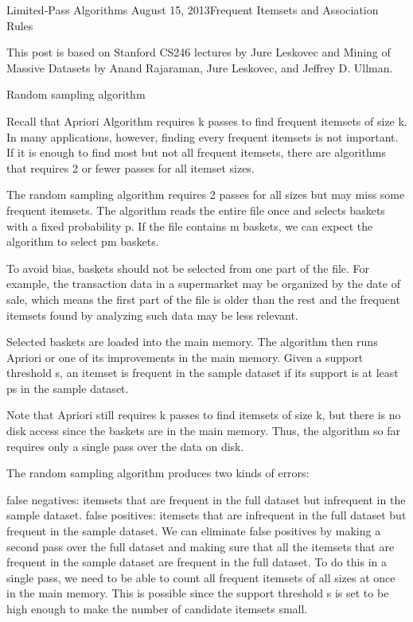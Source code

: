 Limited-Pass Algorithms
August 15, 2013Frequent Itemsets and Association Rules

This post is based on Stanford CS246 lectures by Jure Leskovec and Mining of Massive Datasets by Anand Rajaraman, Jure Leskovec, and Jeffrey D. Ullman.

Random sampling algorithm

Recall that Apriori Algorithm requires k passes to find frequent itemsets of size k. In many applications, however, finding every frequent itemsets is not important. If it is enough to find most but not all frequent itemsets, there are algorithms that requires 2 or fewer passes for all itemset sizes.

The random sampling algorithm requires 2 passes for all sizes but may miss some frequent itemsets. The algorithm reads the entire file once and selects baskets with a fixed probability p. If the file contains m baskets, we can expect the algorithm to select pm baskets.

To avoid bias, baskets should not be selected from one part of the file. For example, the transaction data in a supermarket may be organized by the date of sale, which means the first part of the file is older than the rest and the frequent itemsets found by analyzing such data may be less relevant.

Selected baskets are loaded into the main memory. The algorithm then runs Apriori or one of its improvements in the main memory. Given a support threshold s, an itemset is frequent in the sample dataset if its support is at least ps in the sample dataset.

Note that Apriori still requires k passes to find itemsets of size k, but there is no disk access since the baskets are in the main memory. Thus, the algorithm so far requires only a single pass over the data on disk.

The random sampling algorithm produces two kinds of errors:

false negatives: itemsets that are frequent in the full dataset but infrequent in the sample dataset.
false positives: itemsets that are infrequent in the full dataset but frequent in the sample dataset.
We can eliminate false positives by making a second pass over the full dataset and making sure that all the itemsets that are frequent in the sample dataset are frequent in the full dataset. To do this in a single pass, we need to be able to count all frequent itemsets of all sizes at once in the main memory. This is possible since the support threshold s is set to be high enough to make the number of candidate itemsets small.

